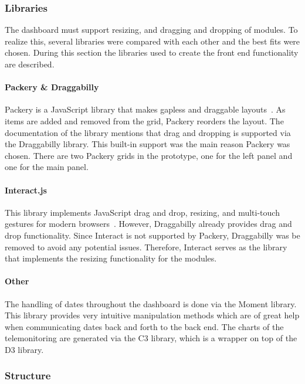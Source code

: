        \subsubsection{Libraries}

        The dashboard must support resizing, and dragging and dropping of modules. To realize this, several libraries were compared with each other and the best fits were chosen. During this section the libraries used to create the front end functionality are described.

            \paragraph{Packery \& Draggabilly} Packery is a JavaScript library that makes gapless and draggable layouts~\cite{Packery}. As items are added and removed from the grid, Packery reorders the layout. The documentation of the library mentions that drag and dropping is supported via the Draggabilly library. This built-in support was the main reason Packery was chosen. There are two Packery grids in the prototype, one for the left panel and one for the main panel. 

            \paragraph{Interact.js} This library implements JavaScript drag and drop, resizing, and multi-touch gestures for modern browsers~\cite{Interact}. However, Draggabilly already provides drag and drop functionality. Since Interact is not supported by Packery, Draggabilly was be removed to avoid any potential issues. Therefore, Interact serves as the library that implements the resizing functionality for the modules.

            \paragraph{Other} The handling of dates throughout the dashboard is done via the Moment library. This library provides very intuitive manipulation methods which are of great help when communicating dates back and forth to the back end. The charts of the telemonitoring are generated via the C3 library, which is a wrapper on top of the D3 library.

        \subsubsection{Structure}

